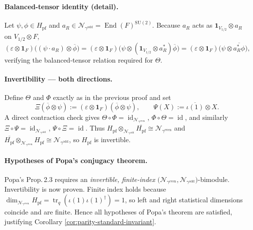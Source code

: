 \documentclass[11pt]{article}
\begin{document}
\paragraph{Balanced-tensor identity (detail).}
Let
$\psi,\phi\in H_{\mathrm{pf}}$ and
$a_R\in\mathcal N_{\gamma^{\mathrm{odd}}}=\operatorname{End}(F)^{\mathrm{SU}(2)}$.
Because $a_R$ acts as $\mathbf1_{V_{1/2}}\!\otimes a_R$ on
$V_{1/2}\!\otimes F$,
\[
  (\varepsilon\!\otimes\!\mathbf1_F)\bigl((\psi\cdot a_R)\otimes\overline\phi\bigr)
  =(\varepsilon\!\otimes\!\mathbf1_F)\bigl(\psi\otimes
      (\mathbf1_{V_{1/2}}\!\otimes a_R^{*})\overline\phi\bigr)
  =(\varepsilon\!\otimes\!\mathbf1_F)\bigl(\psi\otimes\overline{a_R^{*}\phi}\bigr),
\]
verifying the balanced-tensor relation required for $\Theta$.

\paragraph{Invertibility — both directions.}
Define $\Theta$ and $\Phi$ exactly as in the previous proof and set
\[
  \Xi(\overline\phi\otimes\psi)
  :=(\varepsilon\!\otimes\!\mathbf1_F)(\overline\phi\otimes\psi),
  \qquad
  \Psi(X):=\overline{\iota(1)}\otimes X .
\]
A direct contraction check gives
$\Theta\circ\Phi=\operatorname{id}_{\mathcal N_{\gamma^{\mathrm{even}}}}$,
$\Phi\circ\Theta=\operatorname{id}$,
and similarly $\Xi\circ\Psi=\operatorname{id}_{\mathcal N_{\gamma^{\mathrm{odd}}}}$,
$\Psi\circ\Xi=\operatorname{id}$.
Thus
\(
   H_{\mathrm{pf}}\!\otimes_{\mathcal N_{\gamma^{\mathrm{odd}}}}
   \overline{H_{\mathrm{pf}}}\cong\mathcal N_{\gamma^{\mathrm{even}}}
\)
and
\(
   \overline{H_{\mathrm{pf}}}\!\otimes_{\mathcal N_{\gamma^{\mathrm{even}}}}
   H_{\mathrm{pf}}\cong\mathcal N_{\gamma^{\mathrm{odd}}}
\),
so $H_{\mathrm{pf}}$ is invertible.

\paragraph{Hypotheses of Popa’s conjugacy theorem.}
Popa’s Prop.\,2.3 requires an \emph{invertible, finite-index}
$\bigl(\mathcal N_{\gamma^{\mathrm{even}}},
        \mathcal N_{\gamma^{\mathrm{odd}}}\bigr)$-bimodule.
Invertibility is now proven.  Finite index holds because
$\dim_{\mathcal N_{\gamma^{\mathrm{even}}}}H_{\mathrm{pf}}
 =\operatorname{tr}_{q}(\iota(1)\iota(1)^{\dagger})=1$,
so left and right statistical dimensions coincide and are finite.
Hence all hypotheses of Popa’s theorem are satisfied, justifying
Corollary \ref{cor:parity-standard-invariant}.
\end{document}
